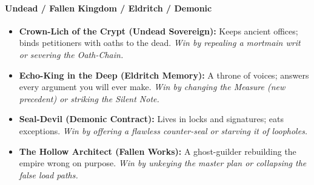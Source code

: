 \paragraph{Undead / Fallen Kingdom / Eldritch / Demonic}
\begin{itemize}
  \item \textbf{Crown-Lich of the Crypt (Undead Sovereign):} Keeps ancient offices; binds petitioners with oaths to the dead. \emph{Win by repealing a mortmain writ or severing the Oath-Chain.}
  \item \textbf{Echo-King in the Deep (Eldritch Memory):} A throne of voices; answers every argument you will ever make. \emph{Win by changing the Measure (new precedent) or striking the Silent Note.}
  \item \textbf{Seal-Devil (Demonic Contract):} Lives in locks and signatures; eats exceptions. \emph{Win by offering a flawless counter-seal or starving it of loopholes.}
  \item \textbf{The Hollow Architect (Fallen Works):} A ghost-guilder rebuilding the empire wrong on purpose. \emph{Win by unkeying the master plan or collapsing the false load paths.}
\end{itemize}

